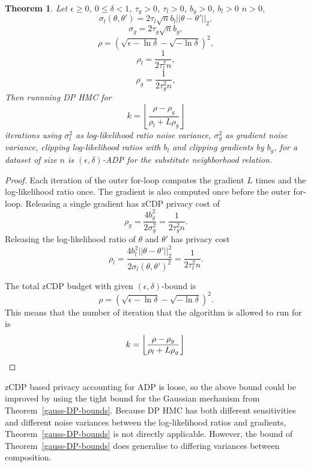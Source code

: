 \documentclass[english,twoside,openright]{HYgraduMLDS}
\newtheorem{theorem}{Theorem}
\begin{document}
\begin{theorem}\label{dp_hmc_theorem_zcdp}
  Let \(\epsilon \geq 0\), \(0 \leq \delta < 1\), \(\tau_{g} > 0\), \(\tau_{l} > 0\),
  \(b_{g} > 0\), \(b_{l} > 0\) \(n > 0\),
  \[\sigma_l(\theta, \theta') = 2\tau_l\sqrt{n}b_l||\theta - \theta'||_2,\]
  \[\sigma_g = 2\tau_g\sqrt{n}b_g,\]
  \[
    \rho = \left(\sqrt{\epsilon - \ln \delta} - \sqrt{-\ln \delta}\right)^2,
  \]
  \[
    \rho_l = \frac{1}{2\tau_l^2n},
  \]
  \[
    \rho_g = \frac{1}{2\tau_g^2n},
  \]
  Then runnning DP HMC for
  \[
    k = \left\lfloor\frac{\rho - \rho_{g}}{\rho_l + L\rho_g}\right\rfloor
  \]
  iterations using \(\sigma_{l}^{2}\) as log-likelihood ratio noise variance,
  \(\sigma_{g}^{2}\) as gradient noise variance, clipping log-likelihood ratios
  with \(b_{l}\) and clipping gradients by \(b_{g}\), for a dataset of size \(n\)
  is \((\epsilon, \delta)\)-ADP for the substitute neighborhood relation.
\end{theorem}
\begin{proof}
Each iteration of the outer for-loop computes the gradient \(L\) times and
the log-likelihood ratio once. The gradient is also computed once before the
outer for-loop. Releasing a single gradient has zCDP privacy
cost of 
\[
    \rho_g = \frac{4b_g^2}{2\sigma_g^2} = \frac{1}{2\tau_g^2n}.
\]
Releasing the log-likelihood ratio of \(\theta\) and \(\theta'\) has privacy cost
\[
    \rho_l = \frac{4b_l^2||\theta - \theta'||_2^2}{2\sigma_l(\theta, \theta')^2} = \frac{1}{2\tau_l^2n}.
\]

The total zCDP budget with given \((\epsilon, \delta)\)-bound is 
\[
    \rho = \left(\sqrt{\epsilon - \ln \delta} - \sqrt{-\ln \delta}\right)^2.
\]
This means that the number of iteration that the algorithm is allowed to run for 
is 
\[
    k = \left\lfloor\frac{\rho - \rho_{g}}{\rho_l + L\rho_g}\right\rfloor
    \qedhere
\]
\end{proof}

zCDP based privacy accounting for ADP is loose, so the above bound could be improved
by using the tight bound for the Gaussian mechanism from
Theorem~\ref{gauss-DP-bounds}. Because DP HMC has both
different sensitivities and different noise variances between the log-likelihood
ratios and gradients, Theorem~\ref{gauss-DP-bounds} is not directly applicable.
However, the bound of Theorem~\ref{gauss-DP-bounds} does generalise to differing
variances between composition.
\end{document}
